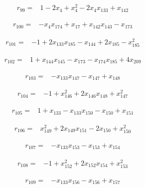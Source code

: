 \documentclass[10pt,letterpaper]{article}
\theoremstyle{remark}\newtheorem{remark}[theorem]{Remark}
\begin{document}
\begin{align*}
r_{99}={}&1-2x_{4}+x_{4}^{2}-2x_{4}x_{133}+x_{142}
\end{align*}

\begin{align*}
r_{100}={}&-x_{4}x_{174}+x_{17}+x_{142}x_{143}-x_{173}
\end{align*}

\begin{align*}
r_{101}={}&-1+2x_{133}x_{185}-x_{144}+2x_{185}-x_{185}^{2}
\end{align*}

\begin{align*}
r_{102}={}&1+x_{144}x_{145}-x_{173}-x_{174}x_{185}+4x_{209}
\end{align*}

\begin{align*}
r_{103}={}&-x_{133}x_{147}-x_{147}+x_{148}
\end{align*}

\begin{align*}
r_{104}={}&-1+x_{146}^{2}+2x_{146}x_{148}+x_{147}^{2}
\end{align*}

\begin{align*}
r_{105}={}&1+x_{133}-x_{133}x_{150}-x_{150}+x_{151}
\end{align*}

\begin{align*}
r_{106}={}&x_{149}^{2}+2x_{149}x_{151}-2x_{150}+x_{150}^{2}
\end{align*}

\begin{align*}
r_{107}={}&-x_{133}x_{153}-x_{153}+x_{154}
\end{align*}

\begin{align*}
r_{108}={}&-1+x_{152}^{2}+2x_{152}x_{154}+x_{153}^{2}
\end{align*}

\begin{align*}
r_{109}={}&-x_{133}x_{156}-x_{156}+x_{157}
\end{align*}
\end{document}

